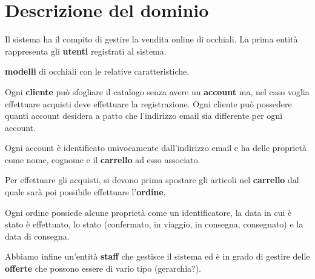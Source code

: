 \section{Descrizione del dominio}
Il sistema ha il compito di gestire la vendita online di occhiali. La prima entità rappresenta gli
\textbf{utenti} registrati al sistema.

\textbf{modelli} di occhiali con le relative caratteristiche.

Ogni \textbf{cliente} può sfogliare il catalogo senza avere un \textbf{account} ma, nel caso
voglia effettuare acquisti deve effettuare la registrazione. Ogni cliente può possedere quanti
account desidera a patto che l'indirizzo email sia differente per ogni account.

Ogni account è identificato univocamente dall'indirizzo email e ha delle proprietà come nome,
cognome e il \textbf{carrello} ad esso associato.

Per effettuare gli acquisti, si devono prima spostare gli articoli nel \textbf{carrello} dal quale
sarà poi possibile effettuare l'\textbf{ordine}.

Ogni ordine possiede alcune proprietà come un identificatore, la data in cui è stato è effettuato,
lo stato (confermato, in viaggio, in consegna, consegnato) e la data di consegna.

Abbiamo infine un'entità \textbf{staff} che gestisce il sistema ed è in grado di gestire delle
\textbf{offerte} che possono essere di vario tipo (gerarchia?).
